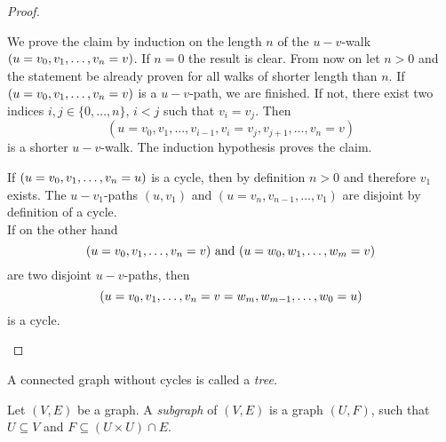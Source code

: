 \begin{proof}
\begin{plist}
\item We prove the claim by induction on the length $n$ of the $u-v$-walk $(u=v_0,\seq{v}=v)$. If $n=0$ the result is clear. From now on let $n>0$ and the statement be already proven for all walks of shorter length than $n$. If $(u=v_0,\seq{v}=v)$ is a $u-v$-path, we are finished. If not, there exist two indices $i,j\in\lbrace 0,\ldots,n\rbrace$, $i<j$ such that $v_i=v_j$. Then
\begin{equation*}
(u=v_0,v_1,\ldots,v_{i-1},v_i=v_j,v_{j+1},\ldots,v_n=v)
\end{equation*}
is a shorter $u-v$-walk. The induction hypothesis proves the claim.
\item If $(u=v_0,\seq{v}=u)$ is a cycle, then by definition $n>0$ and therefore $v_1$ exists. The $u-v_1$-paths $(u,v_1)$ and $(u=v_n,v_{n-1},\ldots,v_1)$ are disjoint by definition of a cycle.\\
If on the other hand 
\begin{equation*}
(u=v_0,\seq{v}=v) \text{ and } (u=w_0,\seq[m]{w}=v) 
\end{equation*}
are two disjoint $u-v$-paths, then
\begin{equation*}
(u=v_0,\seq{v}=v=w_m,w_{m-1},\ldots,w_0=u)
\end{equation*}
is a cycle.
\end{plist}
\end{proof}

\begin{defin}
A connected graph without cycles is called a \emph{tree.}
\end{defin}


\begin{defin}
Let $(V,E)$ be a graph. A \emph{subgraph} of $(V,E)$ is a graph $(U,F)$, such that $U\subseteq V$ and $F\subseteq (U\times U)\cap E.$
\end{defin}

